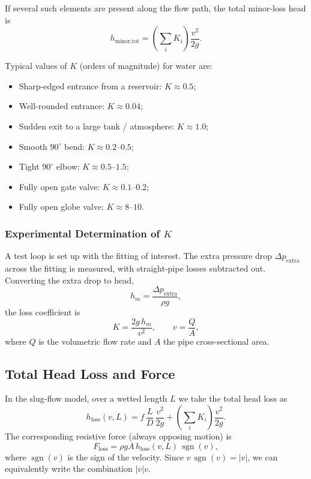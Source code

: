 \documentclass[11pt]{article}
\begin{document}
If several such elements are present along the flow path, the total minor-loss
head is
\[
h_{\text{minor,tot}} =
\left(\sum_i K_i\right)\frac{v^2}{2g}.
\]

Typical values of $K$ (orders of magnitude) for water are:
\begin{itemize}
  \item Sharp-edged entrance from a reservoir: $K \approx 0.5$;
  \item Well-rounded entrance: $K \approx 0.04$;
  \item Sudden exit to a large tank / atmosphere: $K \approx 1.0$;
  \item Smooth $90^\circ$ bend: $K \approx 0.2$--$0.5$;
  \item Tight $90^\circ$ elbow: $K \approx 0.5$--$1.5$;
  \item Fully open gate valve: $K \approx 0.1$--$0.2$;
  \item Fully open globe valve: $K \approx 8$--$10$.
\end{itemize}

\subsubsection*{Experimental Determination of $K$}

A test loop is set up with the fitting of interest. The extra pressure drop
$\Delta p_{\text{extra}}$ across the fitting is measured, with straight-pipe
losses subtracted out. Converting the extra drop to head,
\[
h_m = \frac{\Delta p_{\text{extra}}}{\rho g},
\]
the loss coefficient is
\[
K = \frac{2g\,h_m}{v^2},
\qquad
v = \frac{Q}{A},
\]
where $Q$ is the volumetric flow rate and $A$ the pipe cross-sectional area.

\subsection{Total Head Loss and Force}

In the slug-flow model, over a wetted length $L$ we take the total head loss as
\begin{equation}
h_{\text{loss}}(v,L)
= f\,\frac{L}{D}\,\frac{v^2}{2g}
  + \left(\sum_i K_i\right)\frac{v^2}{2g}.
\end{equation}
The corresponding resistive force (always opposing motion) is
\begin{equation}
F_{\text{loss}} = \rho g A\,h_{\text{loss}}(v,L)\,\operatorname{sgn}(v),
\end{equation}
where $\operatorname{sgn}(v)$ is the sign of the velocity. Since
$v\,\operatorname{sgn}(v) = \lvert v\rvert$, we can equivalently write the
combination $|v|v$.
\end{document}
